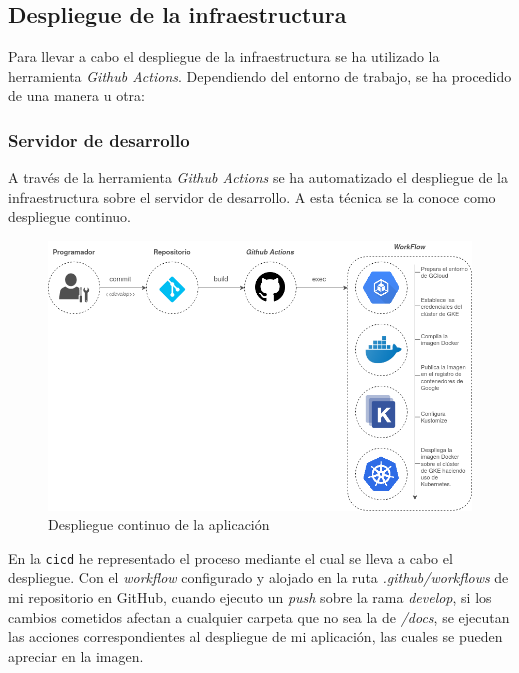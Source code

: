 \documentclass[
]{article}
\begin{document}
\hypertarget{despliegue-de-la-infraestructura}{%
\subsection{Despliegue de la
infraestructura}\label{despliegue-de-la-infraestructura}}

Para llevar a cabo el despliegue de la infraestructura se ha utilizado
la herramienta \emph{Github Actions}. Dependiendo del entorno de
trabajo, se ha procedido de una manera u otra:

\hypertarget{servidor-de-desarrollo}{%
\subsubsection{Servidor de desarrollo}\label{servidor-de-desarrollo}}

A través de la herramienta \emph{Github Actions} se ha automatizado el
despliegue de la infraestructura sobre el servidor de desarrollo. A esta
técnica se la conoce como despliegue continuo.

\begin{figure}
\hypertarget{cicd}{%
\centering
\includegraphics{../_static/images/cicd.png}
\caption{Despliegue continuo de la aplicación}\label{cicd}
}
\end{figure}

En la \texttt{cicd} he representado el proceso mediante el cual se lleva
a cabo el despliegue. Con el \emph{workflow} configurado y alojado en la
ruta \emph{.github/workflows} de mi repositorio en GitHub, cuando
ejecuto un \emph{push} sobre la rama \emph{develop}, si los cambios
cometidos afectan a cualquier carpeta que no sea la de \emph{/docs}, se
ejecutan las acciones correspondientes al despliegue de mi aplicación,
las cuales se pueden apreciar en la imagen.
\end{document}
